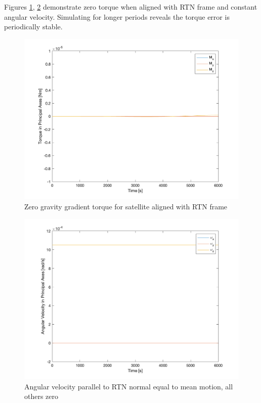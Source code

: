 Figures \ref{fig:ps4_problem4d_torque}, \ref{fig:ps4_problem4d_angvel} demonstrate zero torque when aligned with RTN frame and constant angular velocity. Simulating for longer periods reveals the torque error is periodically stable.

\begin{figure}[H]
\centering
\includegraphics[scale=0.6]{Images/ps4_problem4d_torque.png}
\caption{Zero gravity gradient torque for satellite aligned with RTN frame}
\label{fig:ps4_problem4d_torque}
\end{figure}

\begin{figure}[H]
\centering
\includegraphics[scale=0.6]{Images/ps4_problem4d_angvel.png}
\caption{Angular velocity parallel to RTN normal equal to mean motion, all others zero}
\label{fig:ps4_problem4d_angvel}
\end{figure}

